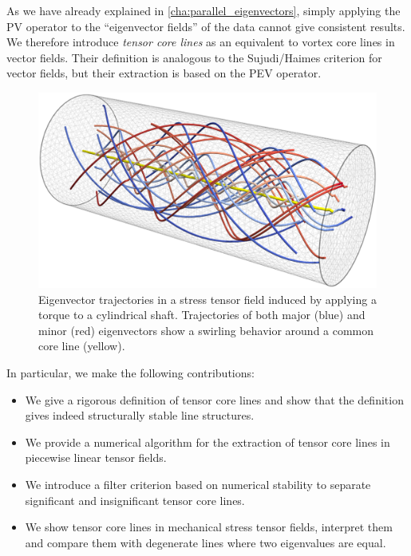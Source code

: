 %
As we have already explained in \cref{cha:parallel_eigenvectors}, simply
applying the \ac{PV} operator to the ``eigenvector fields'' of the data cannot
give consistent results.
%
We therefore introduce \emph{tensor core lines} as an equivalent to vortex
core lines in vector fields.
%
Their definition is analogous to the Sujudi/Haimes criterion for vector fields,
but their extraction is based on the \ac{PEV} operator.
%
\begin{figure}
    \centering
    \includegraphics[width=\columnwidth]{figures/torque_tube_lines.png}
    \caption{Eigenvector trajectories in a stress tensor field induced by
             applying a torque to a cylindrical shaft. Trajectories of both
             major (blue) and minor (red) eigenvectors show a swirling behavior
             around a common core line (yellow).
             }
    \label{fig:tube_lines}
\end{figure}
%
In particular, we make the following contributions:
%
\begin{itemize}
    \item  We give a rigorous definition of tensor core lines and show that the
    definition gives indeed structurally stable line structures.
    \item We provide a numerical algorithm for the extraction of tensor core
    lines in piecewise linear tensor fields.
    \item We introduce a filter criterion based on numerical stability to
    separate significant and insignificant tensor core lines.
    \item We show tensor core lines in mechanical stress tensor fields,
    interpret them and compare them with degenerate lines where two eigenvalues
    are equal.
\end{itemize}
%
%
%
%
